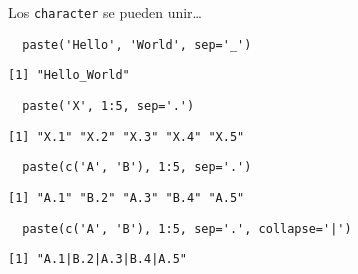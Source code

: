 \documentclass[xcolor={usenames,svgnames,dvipsnames}]{beamer}
\begin{document}
\begin{frame}[fragile,label=sec-3-4]{Los \texttt{character} se pueden unir\ldots{}}
 \lstset{language=R,label= ,caption= ,numbers=none}
\begin{lstlisting}
  paste('Hello', 'World', sep='_')
\end{lstlisting}

\begin{verbatim}
[1] "Hello_World"
\end{verbatim}

\lstset{language=R,label= ,caption= ,numbers=none}
\begin{lstlisting}
  paste('X', 1:5, sep='.')
\end{lstlisting}

\begin{verbatim}
[1] "X.1" "X.2" "X.3" "X.4" "X.5"
\end{verbatim}

\lstset{language=R,label= ,caption= ,numbers=none}
\begin{lstlisting}
  paste(c('A', 'B'), 1:5, sep='.')
\end{lstlisting}

\begin{verbatim}
[1] "A.1" "B.2" "A.3" "B.4" "A.5"
\end{verbatim}

\lstset{language=R,label= ,caption= ,numbers=none}
\begin{lstlisting}
  paste(c('A', 'B'), 1:5, sep='.', collapse='|')
\end{lstlisting}

\begin{verbatim}
[1] "A.1|B.2|A.3|B.4|A.5"
\end{verbatim}
\end{frame}
\end{document}
